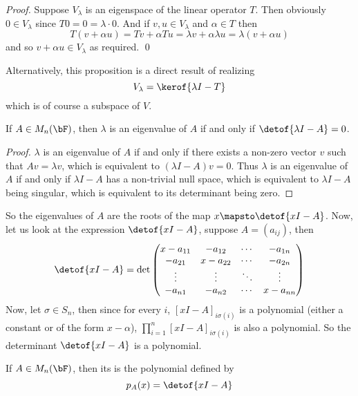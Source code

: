 \begin{proof}

    Suppose $V_\lambda$ is an eigenspace of the linear operator $T$.
    Then obviously $0\in V_\lambda$ since $T0=0=\lambda\cdot0$.
    And if $v,u\in V_\lambda$ and $\alpha\in T$ then
    \[ T(v+\alpha u)=Tv+\alpha Tu=\lambda v + \alpha\lambda u = \lambda(v+\alpha u) \]
    and so $v+\alpha u\in V_\lambda$ as required.
    \qed

\end{proof}

Alternatively, this proposition is a direct result of realizing
\[ V_\lambda = \kerof{\lambda I - T} \]
which is of course a subspace of $V$.

\begin{prop*}

    If $A\in M_n(\bF)$, then $\lambda$ is an eigenvalue of $A$ if and only if $\detof{\lambda I-A}=0$.

\end{prop*}

\begin{proof}

    $\lambda$ is an eigenvalue of $A$ if and only if there exists a non-zero vector $v$ such that $Av=\lambda v$, which is equivalent to $(\lambda I-A)v=0$.
    Thus $\lambda$ is an eigenvalue of $A$ if and only if $\lambda I-A$ has a non-trivial null space, which is equivalent to $\lambda I-A$ being singular, which is equivalent to its determinant being zero.

\end{proof}

So the eigenvalues of $A$ are the roots of the map $x\mapsto\detof{xI-A}$.
Now, let us look at the expression $\detof{xI-A}$, suppose $A=(a_{ij})$, then
\[ \detof{xI-A} = \det\pmat{x-a_{11} & -a_{12} & \cdots & -a_{1n} \\ -a_{21} & x-a_{22} & \cdots & -a_{2n} \\ \vdots & \vdots & \ddots & \vdots \\ -a_{n1} & -a_{n2} & \cdots & x-a_{nn}} \]
Now, let $\sigma\in S_n$, then since for every $i$, $[xI-A]_{i\sigma(i)}$ is a polynomial (either a constant or of the form $x-\alpha$), $\prod_{i=1}^n [xI-A]_{i\sigma(i)}$ is also a polynomial.
So the determinant $\detof{xI-A}$ is a polynomial.

\begin{defn*}

    If $A\in M_n(\bF)$, then its  is the polynomial defined by
    \[ p_A(x) = \detof{xI-A} \]

\end{defn*}

